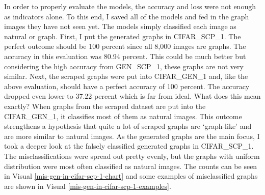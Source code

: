 \documentclass[12pt]{article}
\begin{document}
            In order to properly evaluate the models, the accuracy and loss were not enough as indicators alone. 
            To this end, I saved all of the models and fed in the graph images they have not seen yet. 
            The models simply classified each image as natural or graph. First, I put the generated graphs in CIFAR\_SCP\_1. 
            The perfect outcome should be 100 percent since all 8,000 images are graphs. 
            The accuracy in this evaluation was 80.94 percent. 
            This could be much better but considering the high accuracy from GEN\_SCP\_1, 
            these graphs are not very similar. Next, the scraped graphs were put into CIFAR\_GEN\_1 
            and, like the above evaluation, should have a perfect accuracy of 100 percent. 
            The accuracy dropped even lower to 37.22 percent which is far from ideal. 
            What does this mean exactly? When graphs from the scraped dataset are put into the CIFAR\_GEN\_1, 
            it classifies most of them as natural images. 
            This outcome strengthens a hypothesis that quite a lot of scraped graphs are ‘graph-like’ 
            and are more similar to natural images. As the generated graphs are the main focus, 
            I took a deeper look at the falsely classified generated graphs in CIFAR\_SCP\_1. 
            The misclassifications were spread out pretty evenly, 
            but the graphs with uniform distribution were most often classified as natural images.
            The counts can be seen in Visual \ref{mis-gen-in-cifar-scp-1-chart} 
            and some examples of misclassified graphs are shown in Visual \ref{mis-gen-in-cifar-scp-1-examples}.
            
\end{document}
